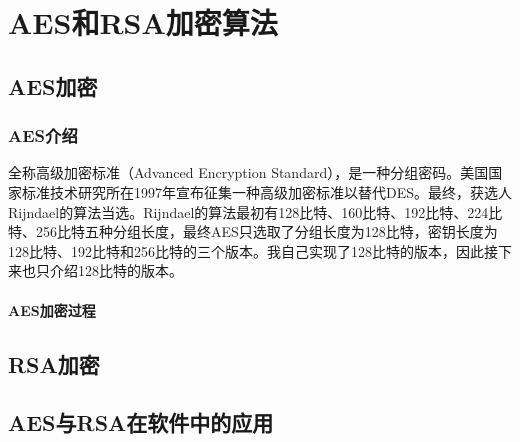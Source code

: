 
\chapter{AES和RSA加密算法}
\label{Chapter::three}

\section{AES加密}
\label{section::AES}

\subsection{AES介绍}
全称高级加密标准（Advanced Encryption Standard），是一种分组密码。美国国家标准技术研究所在1997年宣布征集一种高级加密标准以替代DES。最终，获选人Rijndael的算法当选。Rijndael的算法最初有128比特、160比特、192比特、224比特、256比特五种分组长度，最终AES只选取了分组长度为128比特，密钥长度为128比特、192比特和256比特的三个版本。我自己实现了128比特的版本，因此接下来也只介绍128比特的版本。
\subsubsection{AES加密过程}


\section{RSA加密}
\label{section::RSA}

\section{AES与RSA在软件中的应用}
